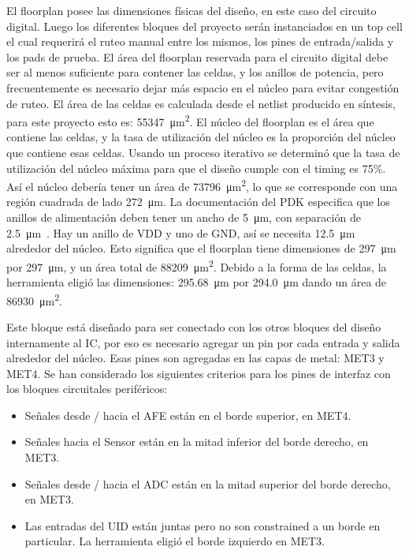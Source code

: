\documentclass[a4paper, twoside, 11pt]{report}
\begin{document}
El floorplan posee las dimensiones físicas del diseño, en este caso del circuito digital. Luego los diferentes bloques del proyecto serán instanciados en un top cell el cual requerirá el ruteo manual entre los mismos, los pines de entrada/salida y los pads de prueba. El área del floorplan reservada para el circuito digital debe ser al menos suficiente para contener las celdas, y los anillos de potencia, pero frecuentemente es necesario dejar más espacio en el núcleo para evitar congestión de ruteo. El área de las celdas es calculada desde el netlist producido en síntesis, para este proyecto esto es: \SI{55347}{\micro\meter\squared}. El núcleo del floorplan es el área que contiene las celdas, y la tasa de utilización del núcleo es la proporción del núcleo que contiene esas celdas. Usando un proceso iterativo se determinó que la tasa de utilización del núcleo máxima para que el diseño cumple con el timing es 75\%. Así el núcleo debería tener un área de \SI{73796}{\micro\meter\squared}, lo que se corresponde con una región cuadrada de lado \SI{272}{\micro\meter}. La documentación del PDK especifica que los anillos de alimentación deben tener un ancho de \SI{5}{\micro\meter}, con separación de \SI{2.5}{\micro\meter}~\cite{dig_imp_guidelines}. Hay un anillo de VDD y uno de GND, así se necesita \SI{12.5}{\micro\meter} alrededor del núcleo. Esto significa que el floorplan tiene dimensiones de \SI{297}{\micro\meter} por \SI{297}{\micro\meter}, y un área total de \SI{88209}{\micro\meter\squared}. Debido a la forma de las celdas, la herramienta eligió las dimensiones: \SI{295.68}{\micro\meter} por \SI{294.0}{\micro\meter} dando un área de \SI{86930}{\micro\meter\squared}.

Este bloque está diseñado para ser conectado con los otros bloques del diseño internamente al IC, por eso es necesario agregar un pin por cada entrada y salida alrededor del núcleo. Esas pines son agregadas en las capas de metal: MET3 y MET4. Se han considerado los siguientes criterios para los pines de interfaz con los bloques circuitales periféricos:

\begin{itemize}
  \item Señales desde / hacia el AFE están en el borde superior, en MET4.
  \item Señales hacia el Sensor están en la mitad inferior del borde derecho, en MET3.
  \item Señales desde / hacia el ADC están en la mitad superior del borde derecho, en MET3.
  \item Las entradas del UID están juntas pero no son constrained a un borde en particular. La herramienta eligió el borde izquierdo en MET3.
\end{itemize}
\end{document}
